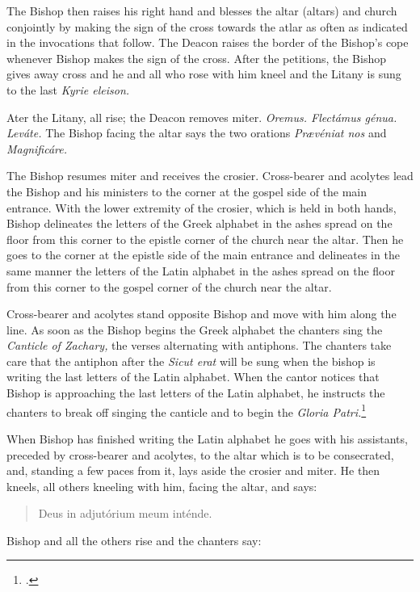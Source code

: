 \documentclass[letterpaper]{report}
\begin{document}
{The Bishop then raises his right hand and blesses the altar (altars) and church
conjointly by making the sign of the cross towards the atlar as often as
indicated in the invocations that follow. The Deacon raises the border of the
Bishop's cope whenever Bishop makes the sign of the cross. After the petitions,
the Bishop gives away cross and he and all who rose with him kneel and the
Litany is sung to the last \textit{Kyrie eleison.}

\rubric Ater the Litany, all rise; the Deacon removes miter. \textit{Oremus.
Flectámus génua. Leváte.} The Bishop facing the altar says the two orations
\textit{Pr\ae véniat nos} and \textit{Magnificáre.}

\rubric The Bishop resumes miter and receives the crosier. Cross-bearer and
acolytes lead the Bishop and his ministers to the corner at the gospel side of
the main entrance. With the lower extremity of the crosier, which is held in
both hands, Bishop delineates the letters of the Greek alphabet in the ashes
spread on the floor from this corner to the epistle corner of the church near
the altar. Then he goes to the corner at the epistle side of the main entrance
and delineates in the same manner the letters of the Latin alphabet in the
ashes spread on the floor from this corner to the gospel corner of the church
near the altar.

Cross-bearer and acolytes stand opposite Bishop and move with him along the
line. As soon as the Bishop begins the Greek alphabet the chanters sing the
\textit{Canticle of Zachary,} the verses alternating with antiphons. The
chanters take care that the antiphon after the \textit{Sicut erat} will be sung
when the bishop is writing the last letters of the Latin alphabet. When the
cantor notices that Bishop is approaching the last letters of the Latin
alphabet, he instructs the chanters to break off singing the canticle and to
begin the \textit{Gloria Patri.}\footcite[][p. 56.]{consecranda}

\rubric When Bishop has finished writing the Latin alphabet he goes with his
assistants, preceded by cross-bearer and acolytes, to the altar which is to be consecrated,
and, standing a few paces from it, lays aside the crosier and miter. He then
kneels, all others kneeling with him, facing the altar, and says:

\begin{quote}
    \vbar Deus in adjutórium meum inténde.
\end{quote}

Bishop and all the others rise and the chanters say:

}
\end{document}
